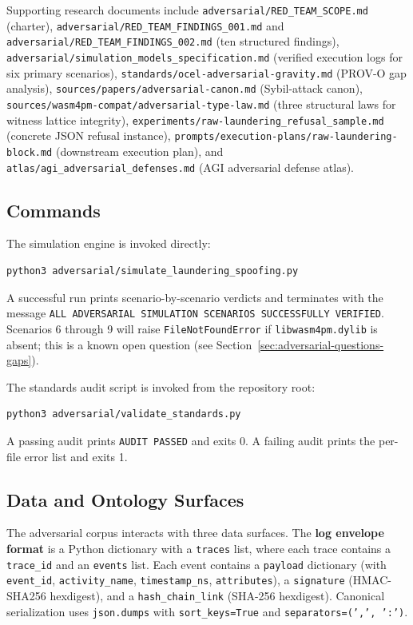 Supporting research documents include \texttt{adversarial/RED\_TEAM\_SCOPE.md} (charter),
\texttt{adversarial/RED\_TEAM\_FINDINGS\_001.md} and
\texttt{adversarial/RED\_TEAM\_FINDINGS\_002.md} (ten structured findings),
\texttt{adversarial/simulation\_models\_specification.md} (verified execution logs for six
primary scenarios), \texttt{standards/ocel-adversarial-gravity.md} (PROV-O gap analysis),
\texttt{sources/papers/adversarial-canon.md} (Sybil-attack canon),
\texttt{sources/wasm4pm-compat/adversarial-type-law.md} (three structural laws for witness
lattice integrity), \texttt{experiments/raw-laundering\_refusal\_sample.md} (concrete JSON
refusal instance), \texttt{prompts/execution-plans/raw-laundering-block.md} (downstream
execution plan), and \texttt{atlas/agi\_adversarial\_defenses.md} (AGI adversarial defense
atlas).

\subsection{Commands}
\label{sec:adversarial-implementation-commands}

The simulation engine is invoked directly:
\begin{verbatim}
python3 adversarial/simulate_laundering_spoofing.py
\end{verbatim}
A successful run prints scenario-by-scenario verdicts and terminates with the message
\texttt{ALL ADVERSARIAL SIMULATION SCENARIOS SUCCESSFULLY VERIFIED}. Scenarios 6 through 9
will raise \texttt{FileNotFoundError} if \texttt{libwasm4pm.dylib} is absent; this is a
known open question (see Section~\ref{sec:adversarial-questions-gaps}).

The standards audit script is invoked from the repository root:
\begin{verbatim}
python3 adversarial/validate_standards.py
\end{verbatim}
A passing audit prints \texttt{AUDIT PASSED} and exits 0. A failing audit prints the
per-file error list and exits 1.

\subsection{Data and Ontology Surfaces}
\label{sec:adversarial-implementation-data}

The adversarial corpus interacts with three data surfaces. The \textbf{log envelope format}
is a Python dictionary with a \texttt{traces} list, where each trace contains a
\texttt{trace\_id} and an \texttt{events} list. Each event contains a \texttt{payload}
dictionary (with \texttt{event\_id}, \texttt{activity\_name}, \texttt{timestamp\_ns},
\texttt{attributes}), a \texttt{signature} (HMAC-SHA256 hexdigest), and a
\texttt{hash\_chain\_link} (SHA-256 hexdigest). Canonical serialization uses
\texttt{json.dumps} with \texttt{sort\_keys=True} and \texttt{separators=(',', ':')}.


